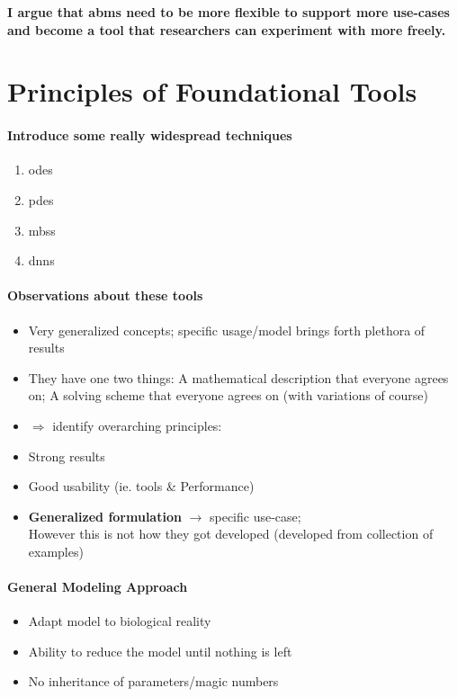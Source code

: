 \documentclass{article}
\begin{document}
\textbf{I argue that \acp{abm} need to be more flexible to support more use-cases and become a tool
that researchers can experiment with more freely.}

\section{Principles of Foundational Tools}

\paragraph{Introduce some really widespread techniques}
\begin{enumerate}
    \item \acfp{ode}
    \item \acfp{pde}
    \item \acfp{mbs}
    \item \acfp{dnn}
\end{enumerate}

\paragraph{Observations about these tools}
\begin{itemize}
    \item Very generalized concepts; specific usage/model brings forth plethora of results
    \item They have one two things: A mathematical description that everyone agrees on; A solving
        scheme that everyone agrees on (with variations of course)
    \item $\Rightarrow$ identify overarching principles:
    \item Strong results
    \item Good usability (ie. tools \& Performance)
    \item \textbf{Generalized formulation} $\longrightarrow$ specific use-case;\\
        However this is not how they got developed (developed from collection of examples)
\end{itemize}

\paragraph{General Modeling Approach}
\begin{itemize}
    \item Adapt model to biological reality
    \item Ability to reduce the model until nothing is left
    \item No inheritance of parameters/magic numbers
\end{itemize}
\end{document}
